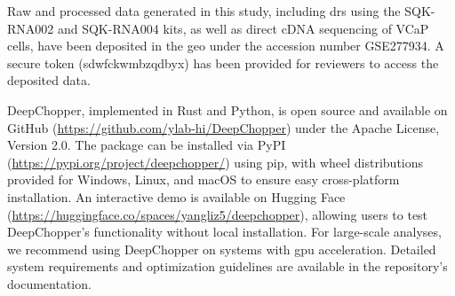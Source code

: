 \documentclass[pdflatex,sn-nature, lineno]{sn-jnl}%
\begin{document}




Raw and processed data generated in this study, including \gls{drs} using the SQK-RNA002 and SQK-RNA004 kits, as well as direct cDNA sequencing of VCaP cells, have been deposited in the \gls{geo} under the accession number GSE277934.
A secure token (sdwfckwmbzqdbyx) has been provided for reviewers to access the deposited data.


DeepChopper, implemented in Rust and Python, is open source and available on GitHub (\url{https://github.com/ylab-hi/DeepChopper}) under the Apache License, Version 2.0.
The package can be installed via PyPI (\url{https://pypi.org/project/deepchopper/}) using pip, with wheel distributions provided for Windows, Linux, and macOS to ensure easy cross-platform installation.
An interactive demo is available on Hugging Face (\url{https://huggingface.co/spaces/yangliz5/deepchopper}), allowing users to test DeepChopper's functionality without local installation.
For large-scale analyses, we recommend using DeepChopper on systems with \gls{gpu} acceleration. Detailed system requirements and optimization guidelines are available in the repository's documentation.
\end{document}
